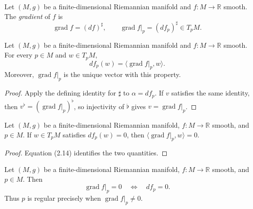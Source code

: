 \begin{definition}
\label{def:gradient}
\leanok
{}
Let $(M,g)$ be a finite-dimensional Riemannian manifold and $f\colon M\to\mathbb R$
smooth. The \emph{gradient} of $f$ is
\[
\operatorname{grad}f=(df)^\sharp,
\qquad \operatorname{grad}f|_p=(df_p)^\sharp\in T_pM.
\]
\end{definition}

\begin{lemma}
\label{lem:gradient-characterization}
\leanok
{}
Let $(M,g)$ be a finite-dimensional Riemannian manifold and $f\colon M\to\mathbb R$
smooth. For every $p\in M$ and $w\in T_pM$,
\[
df_p(w)=\langle\operatorname{grad}f|_p,w\rangle.
\]
Moreover, $\operatorname{grad}f|_p$ is the unique vector with this property.
\end{lemma}

\begin{proof}
\leanok
{}
\sketch Apply the defining identity for $\sharp$ to $\alpha=df_p$. If $v$ satisfies the
same identity, then $v^\flat=(\operatorname{grad}f|_p)^\flat$, so injectivity of
$\flat$ gives $v=\operatorname{grad}f|_p$.
\end{proof}

\begin{lemma}
\label{lem:gradient-orthogonal-kernel}
\leanok
{}
Let $(M,g)$ be a finite-dimensional Riemannian manifold, $f\colon M\to\mathbb R$
smooth, and $p\in M$. If $w\in T_pM$ satisfies $df_p(w)=0$, then
$\langle\operatorname{grad}f|_p,w\rangle=0$.
\end{lemma}

\begin{proof}
\leanok
{}
\sketch Equation (2.14) identifies the two quantities.
\end{proof}

\begin{lemma}
\label{lem:gradient-eq-zero-iff}
\leanok
{}
Let $(M,g)$ be a finite-dimensional Riemannian manifold, $f\colon M\to\mathbb R$
smooth, and $p\in M$. Then
\[
\operatorname{grad}f|_p=0\quad\Longleftrightarrow\quad df_p=0.
\]
Thus $p$ is regular precisely when $\operatorname{grad}f|_p\ne0$.
\end{lemma}

